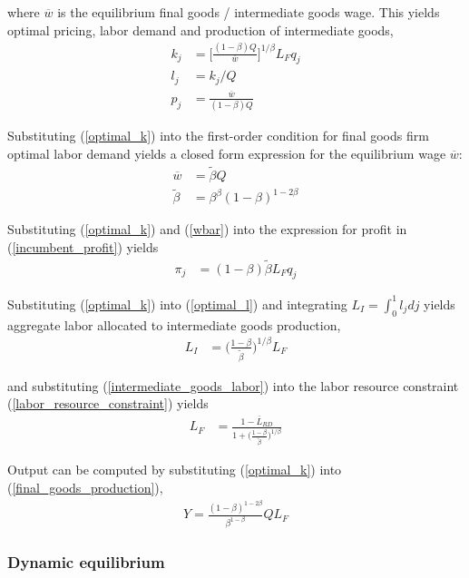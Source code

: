 \documentclass[12pt,english]{article}
\theoremstyle{remark}
\begin{document}
where $\overline{w}$ is the equilibrium final goods / intermediate goods wage.
This yields optimal pricing, labor demand and production of intermediate goods,
\begin{align}
k_j &= \Big[ \frac{(1-\beta) Q}{\overline{w}} \Big]^{1/\beta}L_F q_j  \label{optimal_k}\\
l_j &= k_j / Q \label{optimal_l}\\
p_j &= \frac{\overline{w}}{(1-\beta) Q} \label{optimal_p}
\end{align}

Substituting (\ref{optimal_k}) into the first-order condition for final goods firm optimal labor demand yields a closed form expression for the equilibrium wage $\overline{w}$:
\begin{align}
\overline{w} &= \tilde{\beta} Q \label{wbar} \\
\tilde{\beta} &= \beta^{\beta} (1-\beta)^{1-2\beta} \label{def_cbeta}
\end{align}

Substituting (\ref{optimal_k}) and (\ref{wbar}) into the expression for profit in (\ref{incumbent_profit}) yields
\begin{align}
\pi_j &= (1-\beta) \tilde{\beta} L_F q_j \label{profits_eq}
\end{align}

Substituting (\ref{optimal_k}) into (\ref{optimal_l}) and integrating $L_I = \int_0^1 l_j dj$ yields aggregate labor allocated to intermediate goods production,
\begin{align}
L_I &= \Big( \frac{1-\beta}{\tilde{\beta}} \Big)^{1 / \beta} L_F \label{intermediate_goods_labor}
\end{align}

and substituting (\ref{intermediate_goods_labor}) into the labor resource constraint (\ref{labor_resource_constraint}) yields
\begin{align}
L_F &= \frac{1 - \bar{L}_{RD}}{1 + \Big(\frac{1-\beta}{\tilde{\beta}}\Big)^{1/\beta}}
\end{align}

Output can be computed by substituting (\ref{optimal_k}) into (\ref{final_goods_production}), 
\begin{align}
Y = \frac{(1-\beta)^{1-2\beta}}{\beta^{1-\beta}} Q L_F \label{flow_output}
\end{align}

\subsubsection{Dynamic equilibrium}
\end{document}
